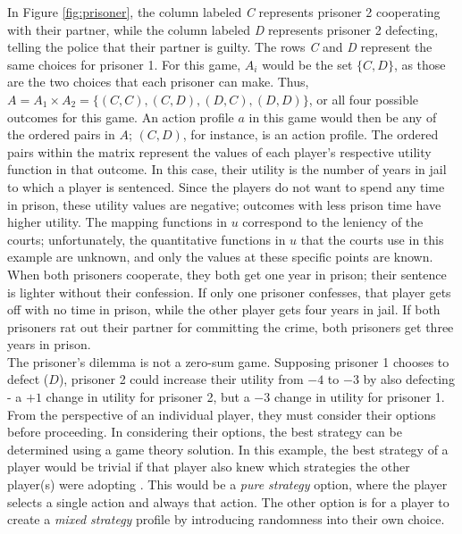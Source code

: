 In Figure \ref{fig:prisoner}, the column labeled \textit{C} represents prisoner 2 cooperating with their partner, while the column labeled \textit{D} represents prisoner 2 defecting, telling the police that their partner is guilty. The rows \textit{C} and \textit{D} represent the same choices for prisoner 1. For this game, $A_i$ would be the set $\{C, D\}$, as those are the two choices that each prisoner can make. Thus, $A=A_1\times A_2 = \{(C, C), (C, D), (D, C), (D, D)\}$, or all four possible outcomes for this game. An action profile $a$ in this game would then be any of the ordered pairs in $A$; $(C,D)$, for instance, is an action profile. The ordered pairs within the matrix represent the values of each player's respective utility function in that outcome. In this case, their utility is the number of years in jail to which a player is sentenced. Since the players do not want to spend any time in prison, these utility values are negative; outcomes with less prison time have higher utility. The mapping functions in $u$ correspond to the leniency of the courts; unfortunately, the quantitative functions in $u$ that the courts use in this example are unknown, and only the values at these specific points are known. When both prisoners cooperate, they both get one year in prison; their sentence is lighter without their confession. If only one prisoner confesses, that player gets off with no time in prison, while the other player gets four years in jail. If both prisoners rat out their partner for committing the crime, both prisoners get three years in prison.\\

The prisoner's dilemma is not a zero-sum game. Supposing prisoner 1 chooses to defect ($D$), prisoner 2 could increase their utility from $-4$ to $-3$ by also defecting - a $+1$ change in utility for prisoner 2, but a $-3$ change in utility for prisoner 1.\\

From the perspective of an individual player, they must consider their options before proceeding. In considering their options, the best strategy can be determined using a game theory solution. In this example, the best strategy of a player would be trivial if that player also knew which strategies the other player(s) were adopting \cite{shoh09}. This would be a \textit{pure strategy} option, where the player selects a single action and always that action. The other option is for a player to create a \textit{mixed strategy} profile by introducing randomness into their own choice.

